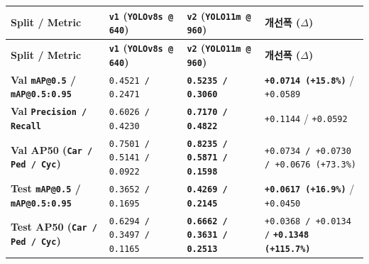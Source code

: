 \documentclass[10.5pt,a4paper]{article}
\begin{document}
\begin{footnotesize}
\setlength{\tabcolsep}{4pt}
\setlength{\LTleft}{0pt}\setlength{\LTright}{0pt}
\begin{longtable}{>{\raggedright\arraybackslash}p{} >{\raggedright\arraybackslash}p{} >{\raggedright\arraybackslash}p{} >{\raggedright\arraybackslash}p{}}
\toprule
\textbf{Split / Metric} & \textbf{\texttt{v1} (\texttt{YOLOv8s @ 640})} & \textbf{\texttt{v2} (\texttt{YOLO11m @ 960})} & \textbf{개선폭 (\texttt{$\Delta$})} \\
\midrule
\endfirsthead
\toprule
\textbf{Split / Metric} & \textbf{\texttt{v1} (\texttt{YOLOv8s @ 640})} & \textbf{\texttt{v2} (\texttt{YOLO11m @ 960})} & \textbf{개선폭 (\texttt{$\Delta$})} \\
\midrule
\endhead
\bottomrule
\endfoot
\textbf{Val \texttt{mAP@0.\allowbreak{}5} / \texttt{mAP@0.\allowbreak{}5:\allowbreak{}0.\allowbreak{}95}} & \texttt{0.\allowbreak{}4521 /\allowbreak{} 0.\allowbreak{}2471} & \textbf{\texttt{0.\allowbreak{}5235 /\allowbreak{} 0.\allowbreak{}3060}} & \textbf{\texttt{+0.\allowbreak{}0714 (+15.\allowbreak{}8\%)}} / \texttt{+0.\allowbreak{}0589} \\
\textbf{Val \texttt{Precision /\allowbreak{} Recall}} & \texttt{0.\allowbreak{}6026 /\allowbreak{} 0.\allowbreak{}4230} & \textbf{\texttt{0.\allowbreak{}7170 /\allowbreak{} 0.\allowbreak{}4822}} & \texttt{+0.\allowbreak{}1144} / \texttt{+0.\allowbreak{}0592} \\
\textbf{Val AP50 (\texttt{Car /\allowbreak{} Ped /\allowbreak{} Cyc})} & \texttt{0.\allowbreak{}7501 /\allowbreak{} 0.\allowbreak{}5141 /\allowbreak{} 0.\allowbreak{}0922} & \textbf{\texttt{0.\allowbreak{}8235 /\allowbreak{} 0.\allowbreak{}5871 /\allowbreak{} 0.\allowbreak{}1598}} & \texttt{+0.\allowbreak{}0734 /\allowbreak{} +0.\allowbreak{}0730 /\allowbreak{} +0.\allowbreak{}0676 (+73.\allowbreak{}3\%)} \\
\textbf{Test \texttt{mAP@0.\allowbreak{}5} / \texttt{mAP@0.\allowbreak{}5:\allowbreak{}0.\allowbreak{}95}} & \texttt{0.\allowbreak{}3652 /\allowbreak{} 0.\allowbreak{}1695} & \textbf{\texttt{0.\allowbreak{}4269 /\allowbreak{} 0.\allowbreak{}2145}} & \textbf{\texttt{+0.\allowbreak{}0617 (+16.\allowbreak{}9\%)}} / \texttt{+0.\allowbreak{}0450} \\
\textbf{Test AP50 (\texttt{Car /\allowbreak{} Ped /\allowbreak{} Cyc})} & \texttt{0.\allowbreak{}6294 /\allowbreak{} 0.\allowbreak{}3497 /\allowbreak{} 0.\allowbreak{}1165} & \textbf{\texttt{0.\allowbreak{}6662 /\allowbreak{} 0.\allowbreak{}3631 /\allowbreak{} 0.\allowbreak{}2513}} & \texttt{+0.\allowbreak{}0368 /\allowbreak{} +0.\allowbreak{}0134 /\allowbreak{}} \textbf{\texttt{+0.\allowbreak{}1348 (+115.\allowbreak{}7\%)}} \\
\end{longtable}
\end{footnotesize}
\end{document}
